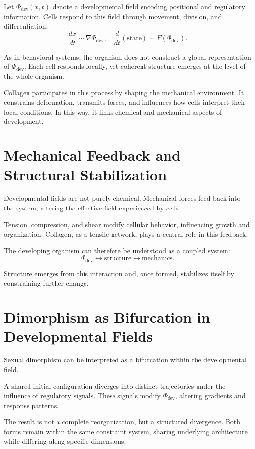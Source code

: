 \documentclass[11pt,oneside]{book}
\begin{document}
Let $\Phi_{\mathrm{dev}}(x,t)$ denote a developmental field encoding positional and regulatory information. Cells respond to this field through movement, division, and differentiation:
\[
\frac{dx}{dt} \sim \nabla \Phi_{\mathrm{dev}}, \quad \frac{d}{dt}(\text{state}) \sim F(\Phi_{\mathrm{dev}}).
\]

As in behavioral systems, the organism does not construct a global representation of $\Phi_{\mathrm{dev}}$. Each cell responds locally, yet coherent structure emerges at the level of the whole organism.

Collagen participates in this process by shaping the mechanical environment. It constrains deformation, transmits forces, and influences how cells interpret their local conditions. In this way, it links chemical and mechanical aspects of development.

\section{Mechanical Feedback and Structural Stabilization}

Developmental fields are not purely chemical. Mechanical forces feed back into the system, altering the effective field experienced by cells.

Tension, compression, and shear modify cellular behavior, influencing growth and organization. Collagen, as a tensile network, plays a central role in this feedback.

The developing organism can therefore be understood as a coupled system:
\[
\Phi_{\mathrm{dev}} \leftrightarrow \text{structure} \leftrightarrow \text{mechanics}.
\]

Structure emerges from this interaction and, once formed, stabilizes itself by constraining further change.

\section{Dimorphism as Bifurcation in Developmental Fields}

Sexual dimorphism can be interpreted as a bifurcation within the developmental field.

A shared initial configuration diverges into distinct trajectories under the influence of regulatory signals. These signals modify $\Phi_{\mathrm{dev}}$, altering gradients and response patterns.

The result is not a complete reorganization, but a structured divergence. Both forms remain within the same constraint system, sharing underlying architecture while differing along specific dimensions.
\end{document}
